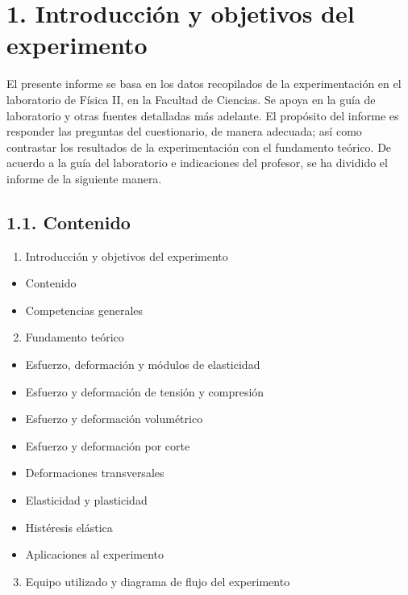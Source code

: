 \documentclass[10pt]{article}
\begin{document}
\section*{1. Introducción y objetivos del experimento}
El presente informe se basa en los datos recopilados de la experimentación en el laboratorio de Física II, en la Facultad de Ciencias. Se apoya en la guía de laboratorio y otras fuentes detalladas más adelante. El propósito del informe es responder las preguntas del cuestionario, de manera adecuada; así como contrastar los resultados de la experimentación con el fundamento teórico. De acuerdo a la guía del laboratorio e indicaciones del profesor, se ha dividido el informe de la siguiente manera.

\subsection*{1.1. Contenido}
\begin{enumerate}
  \item Introducción y objetivos del experimento
\end{enumerate}

\begin{itemize}
  \item Contenido
  \item Competencias generales
\end{itemize}

\begin{enumerate}
  \setcounter{enumi}{1}
  \item Fundamento teórico
\end{enumerate}

\begin{itemize}
  \item Esfuerzo, deformación y módulos de elasticidad
  \item Esfuerzo y deformación de tensión y compresión
  \item Esfuerzo y deformación volumétrico
  \item Esfuerzo y deformación por corte
  \item Deformaciones transversales
  \item Elasticidad y plasticidad
  \item Histéresis elástica
  \item Aplicaciones al experimento
\end{itemize}

\begin{enumerate}
  \setcounter{enumi}{2}
  \item Equipo utilizado y diagrama de flujo del experimento
\end{enumerate}
\end{document}
